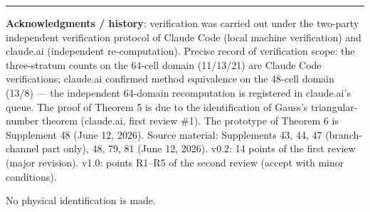 \documentclass[
]{ltjsarticle}
\begin{document}
\begin{center}\rule{0.5\linewidth}{0.5pt}\end{center}

\textbf{Acknowledgments / history}: verification was carried out under
the two-party independent verification protocol of Claude Code (local
machine verification) and claude.ai (independent re-computation).
Precise record of verification scope: the three-stratum counts on the
64-cell domain (11/13/21) are Claude Code verifications; claude.ai
confirmed method equivalence on the 48-cell domain (13/8) --- the
independent 64-domain recomputation is registered in claude.ai's queue.
The proof of Theorem 5 is due to the identification of Gauss's
triangular-number theorem (claude.ai, first review \#1). The prototype
of Theorem 6 is Supplement 48 (June 12, 2026). Source material:
Supplements 43, 44, 47 (branch-channel part only), 48, 79, 81 (June 12,
2026). v0.2: 14 points of the first review (major revision). v1.0:
points R1--R5 of the second review (accept with minor conditions).

No physical identification is made.
\end{document}
